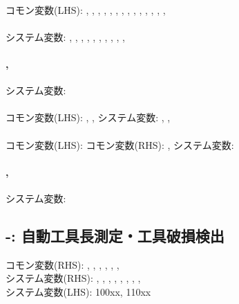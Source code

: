 \paragraph*{}
コモン変数(LHS):
, , , , , , , , , , , , , , 

\paragraph*{}
システム変数:
, , , , , , , , , , 

\paragraph*{, }
システム変数: 

\paragraph*{}
コモン変数(LHS): , ,  \quad
システム変数: , , 

\paragraph*{}
コモン変数(LHS):  \quad
コモン変数(RHS): ,  \quad
システム変数: 

\paragraph*{, }
システム変数: 

\subsection{-: 自動工具長測定・工具破損検出}
\begin{hosoku}\small
コモン変数(RHS): , , , , , , \\
システム変数(RHS): , , , , , , , , \\
システム変数(LHS): \ttNum100xx, \ttNum110xx
\end{hosoku}

